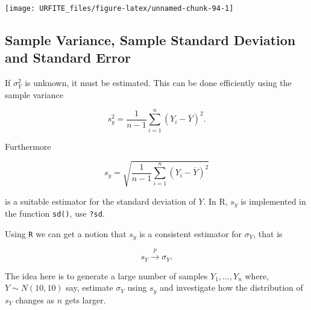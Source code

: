 \documentclass[]{book}
\theoremstyle{definition}
\theoremstyle{definition}
\theoremstyle{definition}
\theoremstyle{remark}
\begin{document}
\begin{center}\texttt{[image: URFITE\_files/figure-latex/unnamed-chunk-94-1]} \end{center}

\subsection*{Sample Variance, Sample Standard Deviation and Standard
Error}\label{SVSSDASE}

If \(\sigma^2_Y\) is unknown, it must be estimated. This can be done
efficiently using the sample variance

\begin{equation}
s_y^2 = \frac{1}{n-1} \sum_{i=1}^n (Y_i - \overline{Y})^2.
\end{equation}

Furthermore

\begin{equation}
s_y = \sqrt{\frac{1}{n-1} \sum_{i=1}^n (Y_i - \overline{Y})^2}
\end{equation}

is a suitable estimator for the standard deviation of \(Y\). In R,
\(s_y\) is implemented in the function \texttt{sd()}, use \texttt{?sd}.

Using \texttt{R} we can get a notion that \(s_y\) is a consistent
estimator for \(\sigma_Y\), that is

\[ s_Y \overset{p}{\longrightarrow} \sigma_Y. \]

The idea here is to generate a large number of samples \(Y_1,\dots,Y_n\)
where, \(Y\sim N(10,10)\) say, estimate \(\sigma_Y\) using \(s_y\) and
investigate how the distribution of \(s_Y\) changes as \(n\) gets
larger.
\end{document}
